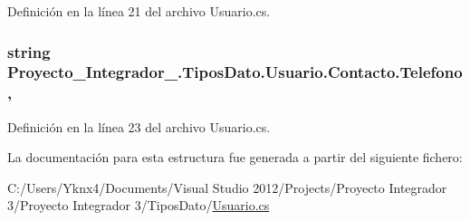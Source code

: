 Definición en la línea 21 del archivo Usuario.\-cs.

\hypertarget{struct_proyecto___integrador__3_1_1_tipos_dato_1_1_usuario_1_1_contacto_ab7f1bc9965c69b9f9c44f5f021fdaec9}{
\subsubsection[{Telefono}]{\setlength{\rightskip}{0pt plus 5cm}string Proyecto\-\_\-\-Integrador\-\_.\-Tipos\-Dato.\-Usuario.\-Contacto.\-Telefono\hspace{0.3cm}{\ttfamily [get]}, {\ttfamily [set]}}}\label{struct_proyecto___integrador__3_1_1_tipos_dato_1_1_usuario_1_1_contacto_ab7f1bc9965c69b9f9c44f5f021fdaec9}


Definición en la línea 23 del archivo Usuario.\-cs.



La documentación para esta estructura fue generada a partir del siguiente fichero\-:\begin{DoxyCompactItemize}
\item 
C\-:/\-Users/\-Yknx4/\-Documents/\-Visual Studio 2012/\-Projects/\-Proyecto Integrador 3/\-Proyecto Integrador 3/\-Tipos\-Dato/\hyperlink{_usuario_8cs}{Usuario.\-cs}\end{DoxyCompactItemize}

